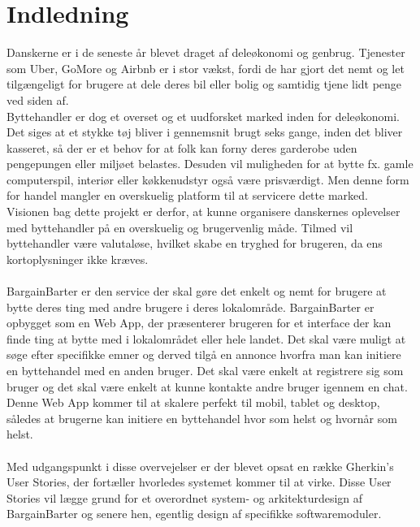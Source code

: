 \chapter{Indledning}
Danskerne er i de seneste år blevet draget af deleøkonomi og genbrug. Tjenester som Uber, GoMore og Airbnb er i stor vækst, fordi de har gjort det nemt og let tilgængeligt for brugere at dele deres bil eller bolig og samtidig tjene lidt penge ved siden af. \\
Byttehandler er dog et overset og et uudforsket marked inden for deleøkonomi. Det siges at et stykke tøj bliver i gennemsnit brugt seks gange, inden det bliver kasseret\cite{bytte}, så der er et behov for at folk kan forny deres garderobe uden pengepungen eller miljøet belastes. Desuden vil muligheden for at bytte fx. gamle computerspil, interiør eller køkkenudstyr også være prisværdigt. Men denne form for handel mangler en overskuelig platform til at servicere dette marked. \\ 
Visionen bag dette projekt er derfor, at kunne organisere danskernes oplevelser med byttehandler på en overskuelig og brugervenlig måde. Tilmed vil byttehandler være valutaløse, hvilket skabe en tryghed for brugeren, da ens kortoplysninger ikke kræves.  \\ \\
BargainBarter er den service der skal gøre det enkelt og nemt for brugere at bytte deres ting med andre brugere i deres lokalområde. BargainBarter er opbygget som en Web App, der præsenterer brugeren for et interface der kan finde ting at bytte med i lokalområdet eller hele landet. Det skal være muligt at søge efter specifikke emner og derved tilgå en annonce hvorfra man kan initiere en byttehandel med en anden bruger. Det skal være enkelt at registrere sig som bruger og det skal være enkelt at kunne kontakte andre bruger igennem en chat. Denne Web App kommer til at skalere perfekt til mobil, tablet og desktop, således at brugerne kan initiere en byttehandel hvor som helst og hvornår som helst.  \\ \\
Med udgangspunkt i disse overvejelser er der blevet opsat en række Gherkin's User Stories, der fortæller hvorledes systemet kommer til at virke. Disse User Stories vil lægge grund for et overordnet system- og arkitekturdesign af BargainBarter og senere hen, egentlig design af specifikke softwaremoduler.   

